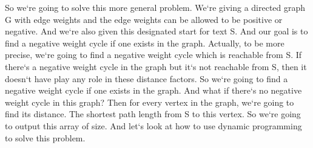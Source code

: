So we`re going to solve this more general problem.
We`re giving a directed graph G with edge weights and the edge weights can be allowed to be positive or negative.
And we`re also given this designated start for text S\@.
And our goal is to find a negative weight cycle if one exists in the graph.
Actually, to be more precise, we`re going to find a negative weight cycle which is reachable from S\@.
If there`s a negative weight cycle in the graph but it`s not reachable from S, then it doesn`t have play any role in these distance factors.
So we`re going to find a negative weight cycle if one exists in the graph.
And what if there`s no negative weight cycle in this graph? Then for every vertex in the graph, we`re going to find its distance.
The shortest path length from S to this vertex.
So we`re going to output this array of size.
And let`s look at how to use dynamic programming to solve this problem.

